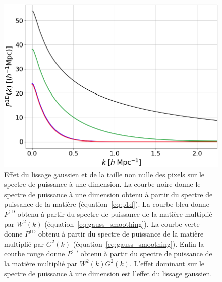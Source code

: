 \begin{figure}
  \centering
  \includegraphics[scale=0.35]{p1d_smoothing}
  \caption{Effet du lissage gaussien et de la taille non nulle des pixels sur le spectre de puissance à une dimension. La courbe noire donne le spectre de puissance à une dimension obtenu à partir du spectre de puissance de la matière (équation~\ref{eq:p1d}). La courbe bleu donne $P^{\mathrm{1D}}$ obtenu à partir du spectre de puissance de la matière multiplié par $W^2(k)$ (équation~\ref{eq:gauss_smoothing}). La courbe verte donne $P^{\mathrm{1D}}$ obtenu à partir du spectre de puissance  de la matière multiplié par $G^2(k)$ (équation~\ref{eq:gauss_smoothing}). Enfin la courbe rouge donne $P^{\mathrm{1D}}$ obtenu à partir du spectre de puissance de la matière multiplié par $W^2(k) G^2(k)$.
  L'effet dominant sur le spectre de puissance à une dimension est l'effet du lissage gaussien.}
  \label{fig:p1d_smoothing}
\end{figure}

